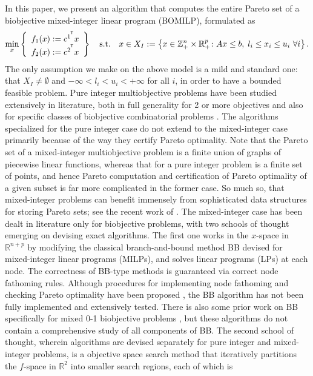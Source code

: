 \documentclass[11.5pt]{article}
\newcommand{\bb}{BB}
\newcommand{\R}{\mathbb{R}}
\newcommand{\Z}{\mathbb{Z}}
\renewcommand{\top}{}
\newcommand*{\tran}{^{\mkern-1.5mu\mathsf{T}}}
\renewcommand{\top}{\tran}
\begin{document}
In this paper, we present an algorithm that computes the entire Pareto set of a biobjective mixed-integer linear program (BOMILP), formulated as
\begin{equation}\label{BOMILP}
\min_{x} \left\{\begin{array}{c} f_1(x) := {c^{1}}^{\top}x \\ f_2(x) := {c^{2}}^{\top}x \end{array}\right\} \quad \text{s.t.} \quad  x \in X_I := \left\{x\in \Z^{n}_+ \times \R^{p}_{+} \colon Ax\leq b,\; l_i \leq x_i \leq u_i \ \forall i\right\}.
\end{equation}
The only assumption we make on the above model is a mild and standard one: that $X_{I}\neq\emptyset$ and $-\infty < l_{i} < u_{i} < +\infty$ for all $i$, in order to have a bounded feasible problem. Pure integer multiobjective problems have been studied extensively in literature, both in full generality for 2 or more objectives \citep{kiziltan1983algorithm,KLEIN1982378,ralphs2006improved,parragh2015boip,jozefowiez2012generic,boland2016quadrant,boland2015shape,mavrotas2013improved,ehrgott2008improved}  and also for specific classes of biobjective combinatorial problems \citep{przybylski2010149,jozefowiez2012generic,sourd2008multiobjective,leitner2014computational,royset2007solving,biobjkp1998,berube2009exact}. The  algorithms specialized for the pure integer case do not extend to the mixed-integer case primarily because of the way they certify Pareto optimality. Note that the Pareto set of a mixed-integer multiobjective problem is a finite union of graphs of piecewise linear functions, whereas that for a pure integer problem is a finite set of points, and hence Pareto computation and certification of Pareto optimality of a given subset is far more  complicated in the former case.  So much so, that mixed-integer problems can benefit immensely from sophisticated data structures for storing Pareto sets; see the recent work of \citet{treestructure}. The mixed-integer case has been dealt in literature only for biobjective problems, with two schools of thought emerging on devising exact algorithms. The first one \citep{belotti2012biobjective} works in the $x$-space in $\R^{n+p}$ by  modifying the classical branch-and-bound method \bb{}  \citep{land1960automatic} devised for mixed-integer linear programs (MILPs), and solves linear programs (LPs) at each node. The correctness of \bb{}-type methods is guaranteed via correct node fathoming rules. Although procedures for implementing node fathoming and checking Pareto optimality have been proposed \citep{belotti2016fathoming}, the \bb{} algorithm has not been fully implemented and extensively tested. There is also some prior work on \bb{} specifically for mixed 0-1 biobjective problems \citep{vincent2013biobjective,mavrotas2005multi,stidsen2014branch}, but these algorithms do not contain a comprehensive study of all components of \bb{}. The second school of thought, wherein algorithms are devised separately for pure integer \citep{boland2015bcriterion} and mixed-integer \citep{boland2013criterion,boland2015acriterion} problems, is a objective space search method that iteratively partitions the $f$-space in $\R^{2}$ into smaller search regions, each of which is 
\end{document}
